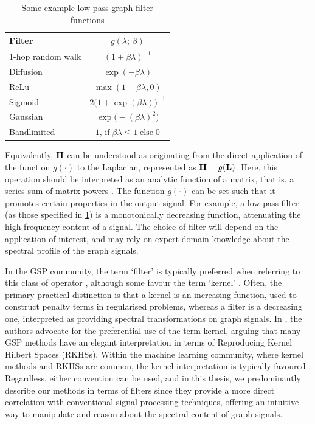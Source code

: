 \begin{table}[t]
    \vspace*{1cm}
    \centering
    \def\arraystretch{1.7}
    \begin{tabular}{@{}l c@{}}
        \toprule
        \textbf{Filter}   & $g(\lambda; \,\beta)$   \\
        \midrule
        1-hop random walk & $(1 + \beta \lambda)^{-1}$ \\
        Diffusion         & $\exp(-\beta \lambda)$\\
        ReLu              & $\max (1 - \beta \lambda, 0)$\\
        Sigmoid           & $2 \big( 1 + \exp(\beta \lambda)\big)^{-1}$\\
        Gaussian          & $\exp \big(-(\beta \lambda)^2\big)$\\
        Bandlimited       & $1, \,\text{if} \; \beta \lambda \leq 1 \; \text{else} \; 0$ \\
        \bottomrule
    \end{tabular}
    \caption[Example graph filter functions]{Some example low-pass graph filter functions}
    \label{tab:filters}
    \vspace*{1cm}
\end{table}


Equivalently, $\mathbf{H}$ can be understood as originating from the direct application of the function $g(\cdot)$ to the Laplacian, represented as $\mathbf{H} = g(\mathbf{L})$. Here, this operation should be interpreted as an analytic function of a matrix, that is, a series sum of matrix powers \citep{Bhatia1997}. The function $g(\cdot)$ can be set such that it promotes certain properties in the output signal. For example, a low-pass filter (as those specified in \cref{tab:filters}) is a monotonically decreasing function, attenuating the high-frequency content of a signal. The choice of filter will depend on the application of interest, and may rely on expert domain knowledge about the spectral profile of the graph signals. 

In the GSP community, the term `filter' is typically preferred when referring to this class of operator \citep{Shuman2013}, although some favour the term `kernel' \citep{Ioannidis2016,Romero2017}. Often, the primary practical distinction is that a kernel is an increasing function, used to construct penalty terms in regularised problems, whereas a filter is a decreasing one, interpreted as providing spectral transformations on graph signals. In \cite{Romero2017b}, the authors advocate for the preferential use of the term kernel, arguing that many GSP methods have an elegant interpretation in terms of Reproducing Kernel Hilbert Spaces (RKHSs). Within the machine learning community, where kernel methods and RKHSs are common, the kernel interpretation is typically favoured \citep{Kondor2002,Smola2003}. Regardless, either convention can be used, and in this thesis, we predominantly describe our methods in terms of filters since they provide a more direct correlation with conventional signal processing techniques, offering an intuitive way to manipulate and reason about the spectral content of graph signals.


